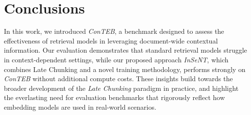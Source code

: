 


\section{Conclusions}
\label{section:conteb:conclusions_and_future_work}

In this work, we introduced \textit{ConTEB}, a benchmark designed to assess the effectiveness of retrieval models in leveraging document-wide contextual information. Our evaluation demonstrates that standard retrieval models struggle in context-dependent settings, while our proposed approach \textit{InSeNT}, which combines Late Chunking and a novel training methodology, performs strongly on \textit{ConTEB} without additional compute costs. %
These insights build towards the broader development of the \textit{Late Chunking} paradigm in practice, and highlight the everlasting need for evaluation benchmarks that rigorously reflect how embedding models are used in real-world scenarios.

